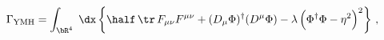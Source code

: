 \begin{equation}
\Gamma_{\rm YMH} = \int_{\bR^4}\; \dx
\left\{ \half \, \tr\, F_{\mu\nu}  F^{\mu\nu} +
       (D_\mu  \Phi)^\dagger (D^\mu \Phi)     -
       \lambda \, \Bigl( \Phi^\dagger \Phi - \eta^2 \Bigr)^2 \right\}\,,
\label{actionYMH}
\end{equation}


